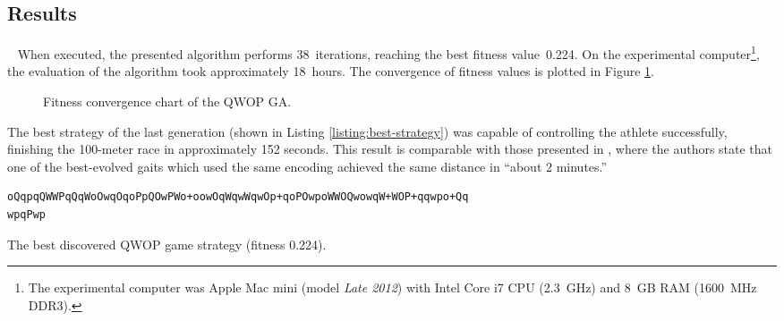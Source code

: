 \subsection{Results}~\label{section:qwop-results}
When executed, the presented algorithm performs 38~iterations, reaching the best fitness value~0.224. On the experimental computer\footnote{The experimental computer was Apple Mac mini (model \textit{Late 2012}) with Intel Core i7 CPU (2.3~GHz) and 8~GB RAM (1600~MHz DDR3).}, the evaluation of the algorithm took approximately 18~hours. The convergence of fitness values is plotted in Figure \ref{fig:qwop-fitness}.

\begin{figure}[ht]
	\centering
	\caption{Fitness convergence chart of the QWOP GA.}
	\label{fig:qwop-fitness}
\end{figure}

The best strategy of the last generation (shown in Listing \ref{listing:best-strategy}) was capable of controlling the athlete successfully, finishing the 100-meter race in approximately 152 seconds. This result is comparable with those presented in \cite{EvolvingQwopGaits}, where the authors state that one of the best-evolved gaits which used the same encoding achieved the same distance in ``about 2 minutes.''

\begin{listing}[ht]
	\begin{verbatim}
oQqpqQWWPqQqWoOwqOqoPpQOwPWo+oowOqWqwWqwOp+qoPOwpoWWOQwowqW+WOP+qqwpo+Qq
wpqPwp
	\end{verbatim}
	\caption[The best discovered QWOP game strategy.]{The best discovered QWOP game strategy (fitness 0.224).}
	\label{listing:best-strategy}
\end{listing}
